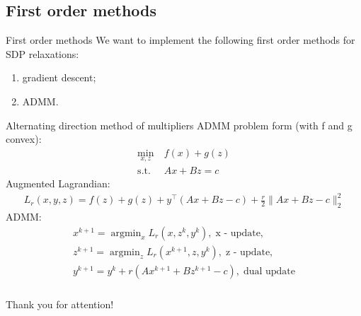 \documentclass[10pt]{beamer}
\newcommand{\argmin}{\mathop{\mathrm{argmin}}}
\begin{document}
    \subsection{First order methods}
        \begin{frame}{First order methods}
            We want to implement the following first order methods for SDP relaxations:
            \begin{enumerate}
                \item gradient descent;
                \item ADMM.
            \end{enumerate}
            
        \end{frame}
        
        \begin{frame}{Alternating direction method of multipliers}
            ADMM problem form (with f and g convex):
            \begin{align*}
                \min_{x, z} &~f(x) + g(z)\\
                \text{s.t.} &~Ax + Bz = c
            \end{align*}
            Augmented Lagrandian:
            \begin{align*}
                L_r(x,y,z)=f(z) + g(z) + y^{\top}(Ax + Bz - c) + \frac{r}{2}\| Ax + Bz - c\|^2_2
            \end{align*}
            ADMM:
            \begin{align*}
                x^{k+1}=\argmin_x L_r (x, z^k, y^k), \; \text{x - update},\\
                z^{k+1}=\argmin_z L_r (x^{k+1}, z, y^k), \; \text{z - update},\\
                y^{k+1}=y^k + r (Ax^{k+1} + Bz^{k+1} - c), \; \text{dual update}
            \end{align*}
            
        \end{frame}
		
	
	\begin{frame}
		\frametitle{}
		
		\begin{center}
			{\LARGE Thank you for attention!}
		\end{center}
		
	\end{frame}
	
\end{document}

